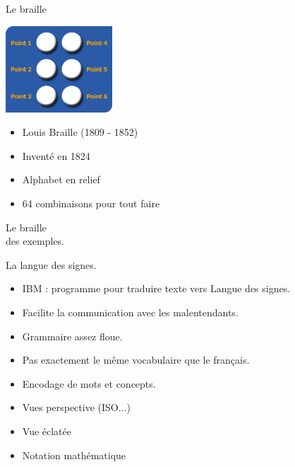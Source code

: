 \documentclass{beamer}
\begin{document}
\begin{frame}  
  \Huge{Le braille}
  \begin{center}
  \includegraphics[width=4cm]{./include/cellule_braille.jpg}
  \end{center}
  \normalsize \begin{itemize}
  \item Louis Braille (1809 - 1852)
  \item Inventé en 1824
  \item Alphabet en relief
  \item 64 combinaisons pour tout faire
  \end{itemize}
\end{frame}

\begin{frame}  
  \Huge Le braille
  \\ des exemples.
\end{frame}


\begin{frame}  
  { \Huge La langue des signes. }
  \begin{itemize}
  \item IBM : programme pour traduire texte vers Langue des signes.
  \item Facilite la communication avec les malentendants.
  \item Grammaire assez floue.
  \item Pas exactement le même vocabulaire que le français.
  \item Encodage de mots et concepts.
  \end{itemize}
\end{frame}

\begin{frame}  
  \begin{itemize}
  \item Vues perspective (ISO...) %
  \item Vue éclatée
  \item Notation mathématique
  \end{itemize}
\end{frame}
\end{document}
